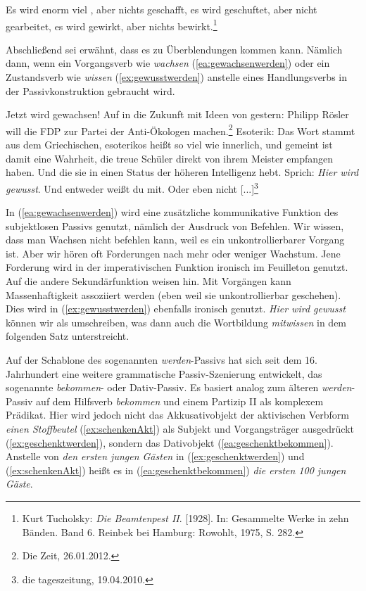 \ea \label{ea:EsPassiv} Es wird enorm viel , aber nichts geschafft, es wird geschuftet, aber nicht gearbeitet, es wird gewirkt, aber nichts bewirkt.\footnote{Kurt Tucholsky: \textit{Die Beamtenpest II}. [1928]. In: Gesammelte Werke in zehn Bänden. Band 6. Reinbek bei Hamburg: Rowohlt, 1975, S. 282.}
\z 

Abschließend sei erwähnt, dass es zu Überblendungen kommen kann. Nämlich dann, wenn ein Vorgangsverb wie \textit{wachsen} (\ref{ea:gewachsenwerden}) oder ein Zustandsverb wie \textit{wissen} (\ref{ex:gewusstwerden}) anstelle eines Handlungsverbs in der Passivkonstruktion gebraucht wird. 

\ea \label{ea:ÜberblendungVorgPass}
\ea \label{ea:gewachsenwerden} Jetzt wird gewachsen! Auf in die Zukunft mit Ideen von gestern: Philipp Rösler will die FDP zur Partei der Anti-Ökologen machen.\footnote{Die Zeit, 26.01.2012.}
\ex \label{ex:gewusstwerden} Esoterik: Das Wort stammt aus dem Griechischen, esoterikos heißt so viel wie innerlich, und gemeint ist damit eine Wahrheit, die treue Schüler direkt von ihrem Meister empfangen haben. Und die sie in einen Status der höheren Intelligenz hebt. Sprich: \textit{Hier wird gewusst}. Und entweder weißt du mit. Oder eben nicht [...]\footnote{die tageszeitung, 19.04.2010.} 
\z 
\z 

In (\ref{ea:gewachsenwerden}) wird eine zusätzliche kommunikative Funktion des subjektlosen Passivs genutzt, nämlich der Ausdruck von Befehlen. Wir wissen, dass man Wachsen nicht befehlen kann, weil es ein unkontrollierbarer Vorgang ist. Aber wir hören oft Forderungen nach mehr oder weniger Wachstum. Jene Forderung wird in der imperativischen Funktion ironisch im Feuilleton genutzt. Auf die andere Sekundärfunktion weisen \citet[1806]{ZifHoffStr1997} hin. Mit Vorgängen kann Massenhaftigkeit assoziiert werden (eben weil sie unkontrollierbar geschehen). Dies wird in (\ref{ex:gewusstwerden}) ebenfalls ironisch genutzt. \textit{Hier wird gewusst} können wir als  umschreiben, was dann auch die Wortbildung \textit{mitwissen} in dem folgenden Satz unterstreicht.    


Auf der Schablone des sogenannten \textit{werden}-Passivs hat sich seit dem 16. Jahrhundert eine weitere grammatische Passiv-Szenierung entwickelt, das sogenannte \textit{bekommen}- oder Dativ-Passiv. Es basiert analog zum älteren \textit{werden}-Passiv auf dem Hilfsverb \textit{bekommen} und einem Partizip II als komplexem Prädikat. Hier wird jedoch nicht das Akkusativobjekt der aktivischen Verbform \textit{einen Stoffbeutel} (\ref{ex:schenkenAkt}) als Subjekt und Vorgangsträger ausgedrückt (\ref{ex:geschenktwerden}), sondern das Dativobjekt (\ref{ea:geschenktbekommen}). Anstelle von \textit{den ersten jungen Gästen} in (\ref{ex:geschenktwerden}) und (\ref{ex:schenkenAkt}) heißt es in (\ref{ea:geschenktbekommen}) \textit{die ersten 100 jungen Gäste}.  

